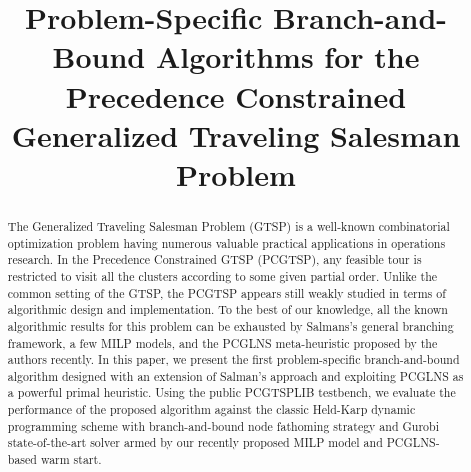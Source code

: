 \documentclass{article}
\title{Problem-Specific Branch-and-Bound Algorithms for the Precedence Constrained\\ Generalized Traveling Salesman Problem }
\begin{document}
\maketitle

\begin{abstract}
The Generalized Traveling Salesman Problem (GTSP) is a well-known combinatorial optimization problem having numerous valuable practical applications in operations research. In the Precedence Constrained GTSP (PCGTSP), any feasible tour is restricted to visit all the clusters according to some given partial order. Unlike the common setting of the GTSP, the PCGTSP appears still weakly studied in terms of algorithmic design and implementation.
To the best of our knowledge, all the known algorithmic results for this problem can be exhausted by Salmans's general branching framework, a few MILP models, and the PCGLNS meta-heuristic proposed by the authors recently. In this paper, we present the first problem-specific branch-and-bound algorithm designed with an extension of Salman's approach and exploiting PCGLNS as a powerful primal heuristic.   Using the public PCGTSPLIB testbench, we evaluate the performance of the proposed algorithm against the classic Held-Karp dynamic programming scheme with branch-and-bound node fathoming strategy and Gurobi state-of-the-art solver armed by our recently proposed MILP model and PCGLNS-based warm start. 
\end{abstract}  


% 







% 


\end{document}
